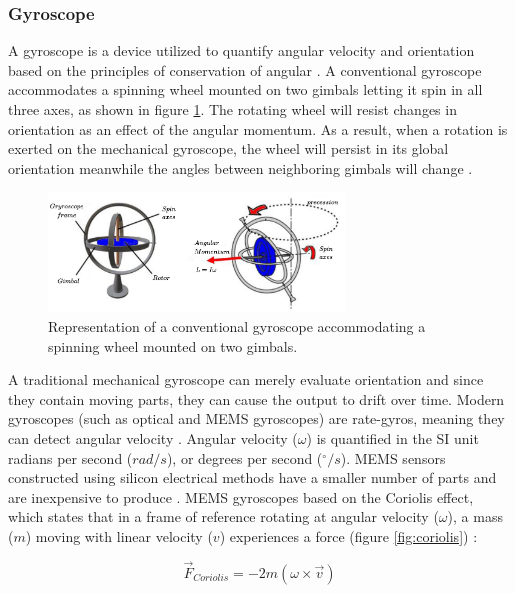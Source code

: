\subsubsection{Gyroscope}

A gyroscope is a device utilized to quantify angular velocity and orientation based on the principles of conservation of angular  \cite{zhuang2020introductory}. A conventional gyroscope accommodates a spinning wheel mounted on two gimbals letting it spin in all three axes, as shown in figure \ref{fig:gyroscope}. The rotating wheel will resist changes in orientation as an effect of the angular momentum. As a result, when a rotation is exerted on the mechanical gyroscope, the wheel will persist in its global orientation meanwhile the angles between neighboring gimbals will change \cite{marotto2013orientation}.

\begin{figure}[!h]
    \centering
    \includegraphics[width=0.7\textwidth]{figures/gyroscope.pdf}
    \caption{ Representation of a conventional gyroscope accommodating a spinning wheel mounted on two gimbals. \cite{marotto2013orientation} }
    \label{fig:gyroscope}
\end{figure}

A traditional mechanical gyroscope can merely evaluate orientation and since they contain moving parts, they can cause the output to drift over time. Modern gyroscopes (such as optical and MEMS gyroscopes) are rate-gyros, meaning they can detect angular velocity \cite{antonello2011mems}. Angular velocity ($\omega$) is quantified in the SI unit radians per second ($rad/s$), or degrees per second ($^{\circ}/s$). MEMS sensors constructed using silicon electrical methods have a smaller number of parts and are inexpensive to produce \cite{antonello2012exploring}. MEMS gyroscopes based on the Coriolis effect, which states that in a frame of reference rotating at angular velocity ($\omega$), a mass ($m$) moving with linear velocity ($v$) experiences a force (figure \ref{fig:coriolis}) \cite{trusov2011overview}:

\begin{equation}
    \overrightarrow{F}_{Coriolis} = -2m(\omega \times \overrightarrow{v} )
\end{equation}


